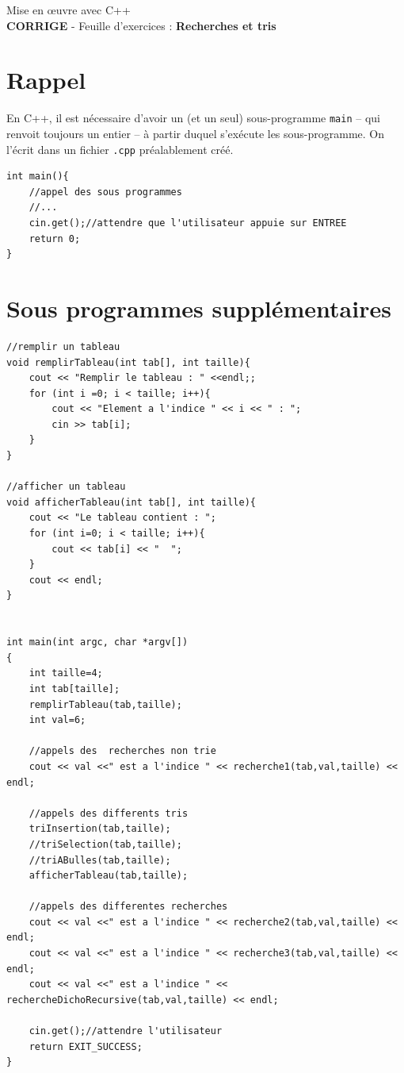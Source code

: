 \documentclass[french]{article}
\begin{document}
	
	\begin{minipage}{\textwidth}
\begin{center}

{\Large Mise en œuvre avec C++ \\ {\color{red}\textbf{CORRIGE}} - Feuille d'exercices : \textbf{Recherches et tris}}
\end{center}
	\end{minipage}
	
\section*{Rappel}
En C++, il est nécessaire d'avoir un (et un seul) sous-programme \texttt{main} -- qui renvoit toujours un entier -- à partir duquel s'exécute les sous-programme. On l'écrit dans un fichier \texttt{.cpp} préalablement créé.
\begin{lstlisting}[caption={Exemple de main dans recherche1.cpp}]
int main(){
    //appel des sous programmes
    //...
    cin.get();//attendre que l'utilisateur appuie sur ENTREE
    return 0;
}    
\end{lstlisting}

\section*{Sous programmes supplémentaires}
	
	\begin{lstlisting}[caption={Sous programmes supplémentaires}]
//remplir un tableau
void remplirTableau(int tab[], int taille){
    cout << "Remplir le tableau : " <<endl;;
    for (int i =0; i < taille; i++){
        cout << "Element a l'indice " << i << " : ";
        cin >> tab[i];
    }
}

//afficher un tableau
void afficherTableau(int tab[], int taille){
    cout << "Le tableau contient : ";
    for (int i=0; i < taille; i++){
        cout << tab[i] << "  ";
    }
    cout << endl;
}


int main(int argc, char *argv[])
{
    int taille=4;
    int tab[taille];
    remplirTableau(tab,taille);
    int val=6;
    
    //appels des  recherches non trie
    cout << val <<" est a l'indice " << recherche1(tab,val,taille) << endl; 
    
    //appels des differents tris
    triInsertion(tab,taille);
    //triSelection(tab,taille);
    //triABulles(tab,taille);
    afficherTableau(tab,taille);
    
    //appels des differentes recherches
    cout << val <<" est a l'indice " << recherche2(tab,val,taille) << endl; 
    cout << val <<" est a l'indice " << recherche3(tab,val,taille) << endl; 
    cout << val <<" est a l'indice " << rechercheDichoRecursive(tab,val,taille) << endl; 
    
    cin.get();//attendre l'utilisateur
    return EXIT_SUCCESS;
}
\end{lstlisting}
\end{document}
